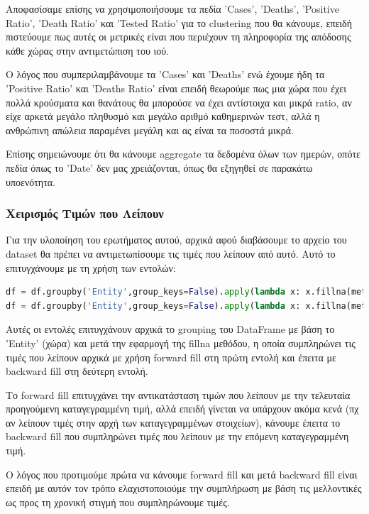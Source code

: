 \documentclass[12pt,a4paper]{article}
\begin{document}
Αποφασίσαμε επίσης να χρησιμοποιήσουμε τα πεδία 'Cases', 'Deaths', 'Positive Ratio', 'Death Ratio' και 'Tested Ratio' για το clustering που θα κάνουμε, επειδή πιστεύουμε πως αυτές οι μετρικές είναι που περιέχουν τη πληροφορία της απόδοσης κάθε χώρας στην αντιμετώπιση του ιού.

Ο λόγος που συμπεριλαμβάνουμε τα 'Cases' και 'Deaths' ενώ έχουμε ήδη τα 'Positive Ratio' και 'Deaths Ratio' είναι επειδή θεωρούμε πως μια χώρα που έχει πολλά κρούσματα και θανάτους θα μπορούσε να έχει αντίστοιχα και μικρά ratio, αν είχε αρκετά μεγάλο πληθυσμό και μεγάλο αριθμό καθημερινών τεστ, αλλά η ανθρώπινη απώλεια παραμένει μεγάλη και ας είναι τα ποσοστά μικρά.

Επίσης σημειώνουμε ότι θα κάνουμε aggregate τα δεδομένα όλων των ημερών, οπότε πεδία όπως το 'Date' δεν μας χρειάζονται, όπως θα εξηγηθεί σε παρακάτω υποενότητα.

\subsubsection{Χειρισμός Τιμών που Λείπουν}

Για την υλοποίηση του ερωτήματος αυτού, αρχικά αφού διαβάσουμε το αρχείο του dataset θα πρέπει να αντιμετωπίσουμε τις τιμές που λείπουν από αυτό. Αυτό το επιτυγχάνουμε με τη χρήση των εντολών:

\begin{lstlisting}[language=Python]
df = df.groupby('Entity',group_keys=False).apply(lambda x: x.fillna(method='ffill'))
df = df.groupby('Entity',group_keys=False).apply(lambda x: x.fillna(method='bfill'))
\end{lstlisting}

Αυτές οι εντολές επιτυγχάνουν αρχικά το grouping του DataFrame με βάση το 'Entity' (χώρα) και μετά την εφαρμογή της fillna μεθόδου, η οποία συμπληρώνει τις τιμές που λείπουν αρχικά με χρήση forward fill στη πρώτη εντολή και έπειτα με backward fill στη δεύτερη εντολή.

Το forward fill επιτυγχάνει την αντικατάσταση τιμών που λείπουν με την τελευταία προηγούμενη καταγεγραμμένη τιμή, αλλά επειδή γίνεται να υπάρχουν ακόμα κενά (πχ αν λείπουν τιμές στην αρχή των καταγεγραμμένων στοιχείων), κάνουμε έπειτα το backward fill που συμπληρώνει τιμές που λείπουν με την επόμενη καταγεγραμμένη τιμή.

Ο λόγος που προτιμούμε πρώτα να κάνουμε forward fill και μετά backward fill είναι επειδή με αυτόν τον τρόπο ελαχιστοποιούμε την συμπλήρωση με βάση τις μελλοντικές ως προς τη χρονική στιγμή που συμπληρώνουμε τιμές.
\end{document}
